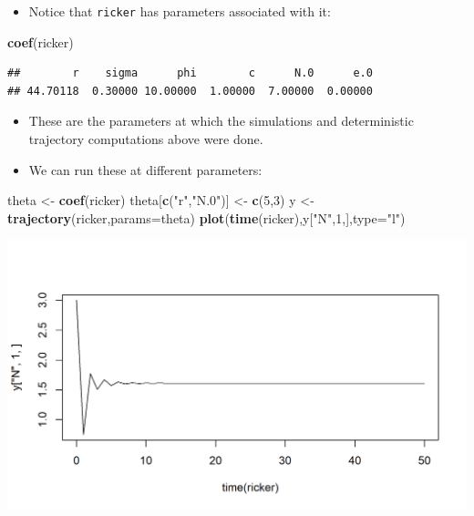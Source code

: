 \documentclass[]{article}
\newenvironment{Shaded}{\begin{snugshade}}{\end{snugshade}}
\newcommand{\KeywordTok}[1]{\textcolor[rgb]{0.13,0.29,0.53}{\textbf{#1}}}
\newcommand{\DataTypeTok}[1]{\textcolor[rgb]{0.13,0.29,0.53}{#1}}
\newcommand{\DecValTok}[1]{\textcolor[rgb]{0.00,0.00,0.81}{#1}}
\newcommand{\StringTok}[1]{\textcolor[rgb]{0.31,0.60,0.02}{#1}}
\newcommand{\NormalTok}[1]{#1}
\providecommand{\tightlist}{%
  \setlength{\itemsep}{0pt}\setlength{\parskip}{0pt}}
\begin{document}
\begin{itemize}
\tightlist
\item
  Notice that \texttt{ricker} has parameters associated with it:
\end{itemize}

\begin{Shaded}
\begin{Highlighting}[]
\KeywordTok{coef}\NormalTok{(ricker)}
\end{Highlighting}
\end{Shaded}

\begin{verbatim}
##        r    sigma      phi        c      N.0      e.0 
## 44.70118  0.30000 10.00000  1.00000  7.00000  0.00000
\end{verbatim}

\begin{itemize}
\item
  These are the parameters at which the simulations and deterministic
  trajectory computations above were done.
\item
  We can run these at different parameters:
\end{itemize}

\begin{Shaded}
\begin{Highlighting}[]
\NormalTok{theta <-}\StringTok{ }\KeywordTok{coef}\NormalTok{(ricker)}
\NormalTok{theta[}\KeywordTok{c}\NormalTok{(}\StringTok{"r"}\NormalTok{,}\StringTok{"N.0"}\NormalTok{)] <-}\StringTok{ }\KeywordTok{c}\NormalTok{(}\DecValTok{5}\NormalTok{,}\DecValTok{3}\NormalTok{)}
\NormalTok{y <-}\StringTok{ }\KeywordTok{trajectory}\NormalTok{(ricker,}\DataTypeTok{params=}\NormalTok{theta)}
\KeywordTok{plot}\NormalTok{(}\KeywordTok{time}\NormalTok{(ricker),y[}\StringTok{"N"}\NormalTok{,}\DecValTok{1}\NormalTok{,],}\DataTypeTok{type=}\StringTok{"l"}\NormalTok{)}
\end{Highlighting}
\end{Shaded}

\begin{center}\includegraphics{figure/intro-unnamed-chunk-5-1} \end{center}
\end{document}
